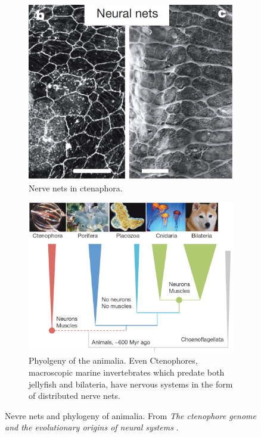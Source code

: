 \begin{figure}
	\centering
	\begin{subfigure}[t]{0.30\textwidth}
		\includegraphics[width=\textwidth]{Figs/neuralNet.png}
		\caption{Nerve nets in ctenaphora.}
		\label{fig:nerveNets}
	\end{subfigure}
	\begin{subfigure}[t]{0.65\textwidth}
		\includegraphics[width=\textwidth]{Figs/animalia3.png}
		\caption{Phyolgeny of the animalia. Even Ctenophores, macroscopic marine invertebrates which predate both jellyfish and bilateria, have nervous systems in the form of distributed nerve nets.}
		\label{fig:animalia2}
	\end{subfigure}
	\caption{Nevre nets and phylogeny of animalia. From {\em {T}he ctenophore genome and the evolutionary origins of neural systems} \cite[p.\ 100]{animalia2}.}
\end{figure}

